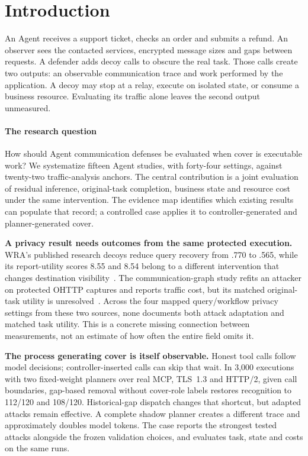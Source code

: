 \section{Introduction}
An Agent receives a support ticket, checks an order and submits a refund. An observer sees the contacted services, encrypted message sizes and gaps between requests. A defender adds decoy calls to obscure the real task. Those calls create two outputs: an observable communication trace and work performed by the application. A decoy may stop at a relay, execute on isolated state, or consume a business resource. Evaluating its traffic alone leaves the second output unmeasured.



\paragraph{The research question}
How should Agent communication defenses be evaluated when cover is executable work? We systematize fifteen Agent studies, with forty-four settings, against twenty-two traffic-analysis anchors. The central contribution is a joint evaluation of residual inference, original-task completion, business state and resource cost under the same intervention. The evidence map identifies which existing results can populate that record; a controlled case applies it to controller-generated and planner-generated cover.

\textbf{A privacy result needs outcomes from the same protected execution.} WRA's published research decoys reduce query recovery from .770 to .565, while its report-utility scores 8.55 and 8.54 belong to a different intervention that changes destination visibility~\cite{jeong2026wra}. The communication-graph study refits an attacker on protected OHTTP captures and reports traffic cost, but its matched original-task utility is unresolved~\cite{dangol2026workflow}. Across the four mapped query/workflow privacy settings from these two sources, none documents both attack adaptation and matched task utility. This is a concrete missing connection between measurements, not an estimate of how often the entire field omits it.

\textbf{The process generating cover is itself observable.} Honest tool calls follow model decisions; controller-inserted calls can skip that wait. In 3,000 executions with two fixed-weight planners over real MCP, TLS~1.3 and HTTP/2, given call boundaries, gap-based removal without cover-role labels restores recognition to 112/120 and 108/120. Historical-gap dispatch changes that shortcut, but adapted attacks remain effective. A complete shadow planner creates a different trace and approximately doubles model tokens. The case reports the strongest tested attacks alongside the frozen validation choices, and evaluates task, state and costs on the same runs.

